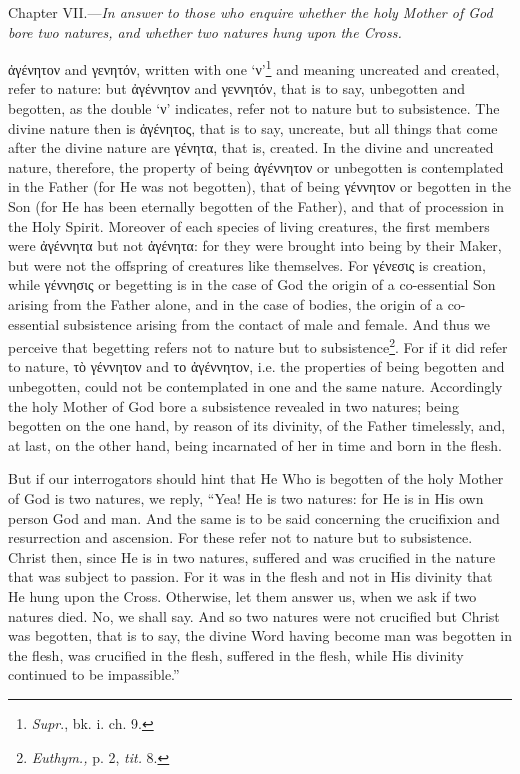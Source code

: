 
Chapter VII.—\emph{In answer to those who enquire whether the holy Mother of God bore two natures, and whether two natures hung upon the Cross.}

\textgreek{ἀγένητον} and \textgreek{γενητόν}, written with one ‘\textgreek{ν’}\footnote{\emph{Supr}., bk. i. ch. 9.} and meaning uncreated and created, refer to nature: but \textgreek{ἀγέννητον} and \textgreek{γεννητόν}, that is to say, unbegotten and begotten, as the double ‘\textgreek{ν}’ indicates, refer not to nature but to subsistence. The divine nature then is \textgreek{ἀγένητος}, that is to say, uncreate, but all things that come after the divine nature are \textgreek{γένητα}, that is, created. In the divine and uncreated nature, therefore, the property of being \textgreek{ἀγέννητον} or unbegotten is contemplated in the Father (for He was not begotten), that of being \textgreek{γέννητον} or begotten in the Son (for He has been eternally begotten of the Father), and that of procession in the Holy Spirit. Moreover of each species of living creatures, the first members were \textgreek{ἀγέννητα} but not \textgreek{ἀγένητα}: for they were brought into being by their Maker, but were not the offspring of creatures like themselves. For \textgreek{γένεσις} is creation, while \textgreek{γέννησις} or begetting is in the case of God the origin of a co-essential Son arising from the Father alone, and in the case of bodies, the origin of a co-essential subsistence arising from the contact of male and female. And thus we perceive that begetting refers not to nature but to subsistence\footnote{\emph{Euthym.,} p. 2, \emph{tit. }8.}. For if it did refer to nature, \textgreek{τὸ γέννητον} and \textgreek{το ἀγέννητον}, i.e. the properties of being begotten and unbegotten, could not be contemplated in one and the same nature. Accordingly the holy Mother of God bore a subsistence revealed in two natures; being begotten on the one hand, by reason of its divinity, of the Father timelessly, and, at last, on the other hand, being incarnated of her in time and born in the flesh.

But if our interrogators should hint that He Who is begotten of the holy Mother of God is two natures, we reply, “Yea! He is two natures: for He is in His own person God and man. And the same is to be said concerning the crucifixion and resurrection and ascension. For these refer not to nature but to subsistence. Christ then, since He is in two natures, suffered and was crucified in the nature that was subject to passion. For it was in the flesh and not in His divinity that He hung upon the Cross. Otherwise, let them answer us, when we ask if two natures died. No, we shall say. And so two natures were not crucified but Christ was begotten, that is to say, the divine Word having become man was begotten in the flesh, was crucified in the flesh, suffered in the flesh, while His divinity continued to be impassible.”


